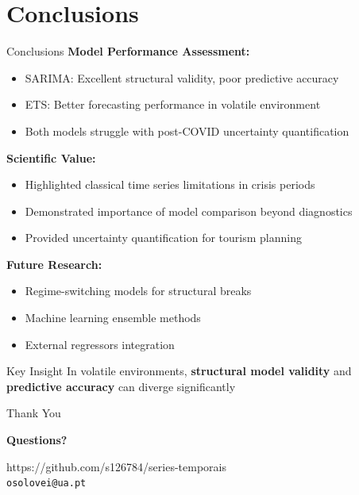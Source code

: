 \documentclass[10pt]{beamer}
\begin{document}
\section{Conclusions}

\begin{frame}{Conclusions}
\textbf{Model Performance Assessment:}
\begin{itemize}
\item SARIMA: Excellent structural validity, poor predictive accuracy
\item ETS: Better forecasting performance in volatile environment
\item Both models struggle with post-COVID uncertainty quantification
\end{itemize}

\textbf{Scientific Value:}
\begin{itemize}
\item Highlighted classical time series limitations in crisis periods
\item Demonstrated importance of model comparison beyond diagnostics
\item Provided uncertainty quantification for tourism planning
\end{itemize}

\textbf{Future Research:}
\begin{itemize}
\item Regime-switching models for structural breaks
\item Machine learning ensemble methods  
\item External regressors integration
\end{itemize}

\begin{alertblock}{Key Insight}
In volatile environments, \textbf{structural model validity} and \textbf{predictive accuracy} can diverge significantly
\end{alertblock}
\end{frame}



\begin{frame}{Thank You}
\begin{center}
\Large{\textbf{Questions?}}

\vspace{0.3cm}

https://github.com/s126784/series-temporais\\
\texttt{osolovei@ua.pt}
\end{center}
\end{frame}
\end{document}
